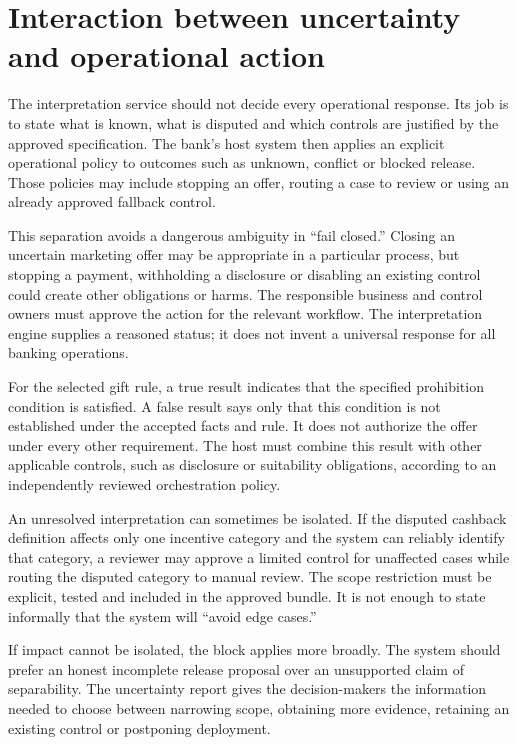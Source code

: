 \section{Interaction between uncertainty and operational action}
\label{merge:M06:24}


The interpretation service should not decide every operational response. Its job
is to state what is known, what is disputed and which controls are justified by
the approved specification. The bank's host system then applies an explicit
operational policy to outcomes such as unknown, conflict or blocked release.
Those policies may include stopping an offer, routing a case to review or using
an already approved fallback control.

This separation avoids a dangerous ambiguity in ``fail closed.'' Closing an
uncertain marketing offer may be appropriate in a particular process, but
stopping a payment, withholding a disclosure or disabling an existing control
could create other obligations or harms. The responsible business and control
owners must approve the action for the relevant workflow. The interpretation
engine supplies a reasoned status; it does not invent a universal response for
all banking operations.


For the selected gift rule, a true result indicates that the specified
prohibition condition is satisfied. A false result says only that this condition
is not established under the accepted facts and rule. It does not authorize the
offer under every other requirement. The host must combine this result with other
applicable controls, such as disclosure or suitability obligations, according to
an independently reviewed orchestration policy.

An unresolved interpretation can sometimes be isolated. If the disputed cashback
definition affects only one incentive category and the system can reliably
identify that category, a reviewer may approve a limited control for unaffected
cases while routing the disputed category to manual review. The scope restriction
must be explicit, tested and included in the approved bundle. It is not enough to
state informally that the system will ``avoid edge cases.''

If impact cannot be isolated, the block applies more broadly. The system should
prefer an honest incomplete release proposal over an unsupported claim of
separability. The uncertainty report gives the decision-makers the information
needed to choose between narrowing scope, obtaining more evidence, retaining an
existing control or postponing deployment.

